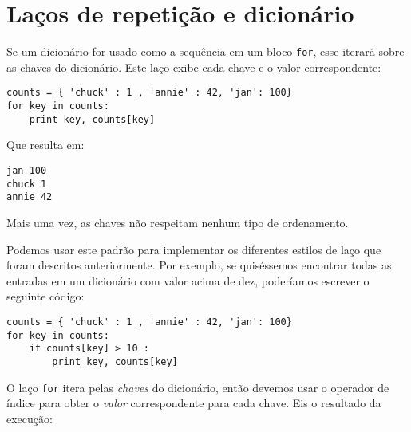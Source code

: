\section{Laços de repetição e dicionário}


Se um dicionário for usado como a sequência em um bloco {\tt for}, esse iterará sobre as chaves do dicionário. Este laço exibe cada chave e o valor correspondente:

\beforeverb
\begin{verbatim}
counts = { 'chuck' : 1 , 'annie' : 42, 'jan': 100}
for key in counts:
    print key, counts[key]
\end{verbatim}
\afterverb
%
Que resulta em:

\beforeverb
\begin{verbatim}
jan 100
chuck 1
annie 42
\end{verbatim}
\afterverb
%
Mais uma vez, as chaves não respeitam nenhum tipo de ordenamento.

Podemos usar este padrão para implementar os diferentes estilos de laço que foram descritos anteriormente. Por exemplo, se quiséssemos encontrar todas as entradas em um dicionário com valor acima de dez, poderíamos escrever o seguinte código:

\beforeverb
\begin{verbatim}
counts = { 'chuck' : 1 , 'annie' : 42, 'jan': 100}
for key in counts:
    if counts[key] > 10 :
        print key, counts[key]
\end{verbatim}
\afterverb
%
O laço {\tt for} itera pelas {\em chaves} do dicionário, então devemos usar o operador de índice para obter o {\em valor} correspondente para cada chave.
Eis o resultado da execução:

